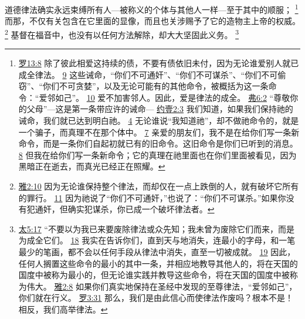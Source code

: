 \documentclass[12pt, a4paper, oneside]{ctexart}
\newcounter{parnum}[section]
\newcommand{\N}{%
   \noindent\refstepcounter{parnum}%
    \makebox[\parindent][l]{\textbf{\arabic{parnum}.}}}
\begin{document}
\N 道德律法确实永远束缚所有人---被称义的个体与其他人一样---至于其中的顺服；
	\footnote {
		\href{https://biblehub.com/romans/13-8.htm}{罗13:8} 除了彼此相爱这持续的债，不要有债依旧未付，因为无论谁爱别人就已成全律法。
		\href{https://biblehub.com/romans/13-9.htm}{9} 这些诫命，“你们不可通奸”、“你们不可谋杀”、“你们不可偷窃”、“你们不可贪婪”，以及无论可能有的其他命令，被概括为这一条命令：“爱邻如己”。
		\href{https://biblehub.com/romans/13-10.htm}{10} 爱不加害邻人。因此，爱是律法的成全。
		\href{https://biblehub.com/ephesians/6-2.htm}{弗6:2} “尊敬你的父母”---这是第一条带应许的诫命---
		\href{https://biblehub.com/1_john/2-3.htm}{约壹2:3} 我们知道，如果我们保持祂的诫命，我们就已达到明白祂。
		\href{https://biblehub.com/1_john/2-4.htm}{4} 无论谁说“我知道祂”，却不做祂命令的，就是一个骗子，而真理不在那个体中。
		\href{https://biblehub.com/1_john/2-7.htm}{7} 亲爱的朋友们，我不是在给你们写一条新命令，而是一条你们自起初就已有的旧命令。这旧命令是你们已听到的消息。
		\href{https://biblehub.com/1_john/2-8.htm}{8} 但我在给你们写一条新命令；它的真理在祂里面也在你们里面被看见，因为黑暗正在逝去，而真光已经正在照耀。
	}
	而那，不仅有关包含在它里面的显像，而且也关涉赐予了它的造物主上帝的权威。
	\footnote {
		\href{https://biblehub.com/james/2-10.htm}{雅2:10} 因为无论谁保持整个律法，而却仅在一点上跌倒的人，就有破坏它所有的罪行。
		\href{https://biblehub.com/james/2-11.htm}{11} 因为祂说了“你们不可通奸，”也说了：“你们不可谋杀。”如果你没有犯通奸，但确实犯谋杀，你已成一个破坏律法者。
	}
	基督在福音中，也没有以任何方法解除，却大大坚固此义务。
	\footnote {
		\href{https://biblehub.com/matthew/5-17.htm}{太5:17} “不要以为我已来要废除律法或众先知；我未曾为废除它们而来，而是为成全它们。
		\href{https://biblehub.com/matthew/5-18.htm}{18} 我实在告诉你们，直到天与地消失，连最小的字母，和一笔最少的笔画，都不会以任何手段从律法中消失，直至一切被成就。
		\href{https://biblehub.com/matthew/5-19.htm}{19} 因此，任何人搁置这些命令的最小的其中一条，并相应地教导其他人的，将在天国的国度中被称为最小的，但无论谁实践并教导这些命令，将在天国的国度中被称为伟大。
		\href{https://biblehub.com/james/2-8.htm}{雅2:8} 如果你们真实地保持在圣经中发现的至尊律法，“爱邻如己”，你们就在行义。
		\href{https://biblehub.com/romans/3-31.htm}{罗3:31} 那么，我们是由此信心而使律法作废吗？根本不是！相反，我们高举律法。
	}
\end{document}
